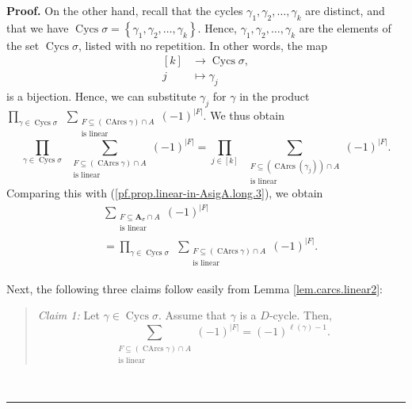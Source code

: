\documentclass[numbers=enddot,12pt,final,onecolumn,notitlepage]{scrartcl}%
\numberwithin{exer}{section}
\theoremstyle{definition}
\newenvironment{statement}{\begin{quote}}{\end{quote}}
\newenvironment{proof}[1][Proof]{\noindent\textbf{#1.} }{\ \rule{0.5em}{0.5em}}
\let\sumnonlimits\sum
\let\prodnonlimits\prod
\renewcommand{\sum}{\sumnonlimits\limits}
\renewcommand{\prod}{\prodnonlimits\limits}
\newenvironment{verlong}{}{}
\begin{document}
\begin{verlong}
\begin{proof}
On the other hand, recall that the cycles $\gamma_{1},\gamma_{2},\ldots
,\gamma_{k}$ are distinct, and that we have $\operatorname*{Cycs}%
\sigma=\left\{  \gamma_{1},\gamma_{2},\ldots,\gamma_{k}\right\}  $. Hence,
$\gamma_{1},\gamma_{2},\ldots,\gamma_{k}$ are the elements of the set
$\operatorname*{Cycs}\sigma$, listed with no repetition. In other words, the
map
\begin{align*}
\left[  k\right]   &  \rightarrow\operatorname*{Cycs}\sigma,\\
j  &  \mapsto\gamma_{j}%
\end{align*}
is a bijection. Hence, we can substitute $\gamma_{j}$ for $\gamma$ in the
product \newline$\prod_{\gamma\in\operatorname*{Cycs}\sigma}\ \ \sum
_{\substack{F\subseteq\left(  \operatorname*{CArcs}\gamma\right)  \cap
A\\\text{is linear}}}\left(  -1\right)  ^{\left\vert F\right\vert }$. We thus
obtain%
\[
\prod_{\gamma\in\operatorname*{Cycs}\sigma}\ \ \sum_{\substack{F\subseteq
\left(  \operatorname*{CArcs}\gamma\right)  \cap A\\\text{is linear}}}\left(
-1\right)  ^{\left\vert F\right\vert }=\prod_{j\in\left[  k\right]  }%
\ \ \sum_{\substack{F\subseteq\left(  \operatorname*{CArcs}\left(  \gamma
_{j}\right)  \right)  \cap A\\\text{is linear}}}\left(  -1\right)
^{\left\vert F\right\vert }.
\]
Comparing this with (\ref{pf.prop.linear-in-AsigA.long.3}), we obtain%
\begin{align}
&  \sum_{\substack{F\subseteq\mathbf{A}_{\sigma}\cap A\\\text{is linear}%
}}\left(  -1\right)  ^{\left\vert F\right\vert }\nonumber\\
&  =\prod_{\gamma\in\operatorname*{Cycs}\sigma}\ \ \sum_{\substack{F\subseteq
\left(  \operatorname*{CArcs}\gamma\right)  \cap A\\\text{is linear}}}\left(
-1\right)  ^{\left\vert F\right\vert }. \label{pf.prop.linear-in-AsigA.long.4}%
\end{align}


Next, the following three claims follow easily from Lemma
\ref{lem.carcs.linear2}:

\begin{statement}
\textit{Claim 1:} Let $\gamma\in\operatorname*{Cycs}\sigma$. Assume that
$\gamma$ is a $D$-cycle. Then,%
\[
\sum_{\substack{F\subseteq\left(  \operatorname*{CArcs}\gamma\right)  \cap
A\\\text{is linear}}}\left(  -1\right)  ^{\left\vert F\right\vert }=\left(
-1\right)  ^{\ell\left(  \gamma\right)  -1}.
\]


\end{statement}
\end{proof}
\end{verlong}
\end{document}
